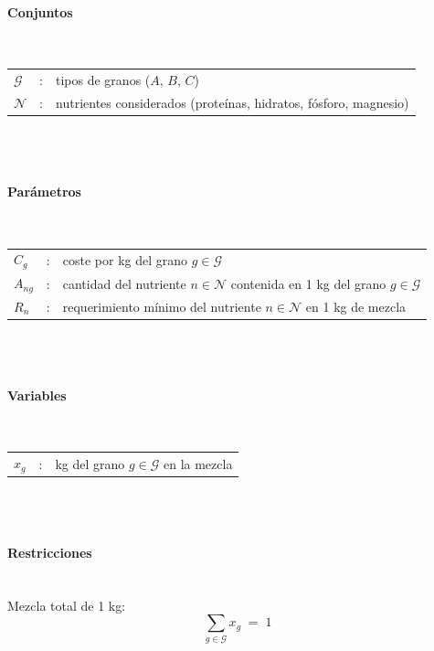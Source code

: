 \paragraph{Conjuntos}\mbox{}\\

\begin{tabular}{l c l}
    $\mathcal{G}$  & : & tipos de granos ($A$, $B$, $C$) \\
    $\mathcal{N}$  & : & nutrientes considerados (proteínas, hidratos, fósforo, magnesio) \\
\end{tabular}
\\
\\

\paragraph{Parámetros}\mbox{}\\

\begin{tabular}{l c l}
    $C_g$     & : & coste por kg del grano $g \in \mathcal{G}$ \\
    $A_{ng}$  & : & cantidad del nutriente $n \in \mathcal{N}$ contenida en 1 kg del grano $g \in \mathcal{G}$ \\
    $R_n$     & : & requerimiento mínimo del nutriente $n \in \mathcal{N}$ en 1 kg de mezcla \\
\end{tabular}
\\
\\

\paragraph{Variables}\mbox{}\\

\begin{tabular}{l c l}
    $x_g$  & : & kg del grano $g \in \mathcal{G}$ en la mezcla \\
\end{tabular}
\\
\\

\paragraph{Restricciones}\mbox{}\\

Mezcla total de 1 kg:
\begin{equation}
\sum_{g \in \mathcal{G}} x_g \;=\; 1
\end{equation}

